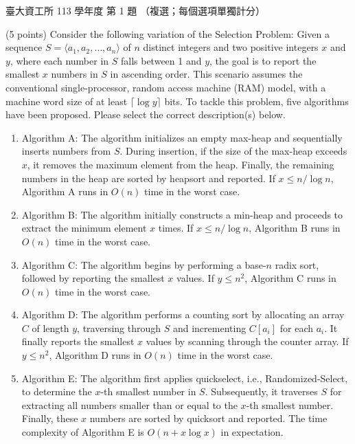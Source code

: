 \begin{pastexam}[label={px:ntu-113-dsa-01}]{臺大資工所 113 學年度 第 1 題}
（複選；每個選項單獨計分）

(5 points) Consider the following variation of the Selection Problem: Given a sequence
$S=\langle a_1,a_2,\ldots,a_n\rangle$ of $n$ distinct integers and two positive integers $x$ and $y$,
where each number in $S$ falls between 1 and $y$, the goal is to report the smallest $x$ numbers in
$S$ in ascending order. This scenario assumes the conventional single-processor, random access
machine (RAM) model, with a machine word size of at least $\lceil\log y\rceil$ bits. To tackle this
problem, five algorithms have been proposed. Please select the correct description(s) below.
\begin{enumerate}[label=\Alph*.]
\item Algorithm A: The algorithm initializes an empty max-heap and sequentially inserts numbers from
$S$. During insertion, if the size of the max-heap exceeds $x$, it removes the maximum element from
the heap. Finally, the remaining numbers in the heap are sorted by heapsort and reported. If
$x\le n/\log n$, Algorithm A runs in $O(n)$ time in the worst case.
\item Algorithm B: The algorithm initially constructs a min-heap and proceeds to extract the minimum
element $x$ times. If $x\le n/\log n$, Algorithm B runs in $O(n)$ time in the worst case.
\item Algorithm C: The algorithm begins by performing a base-$n$ radix sort, followed by reporting
the smallest $x$ values. If $y\le n^2$, Algorithm C runs in $O(n)$ time in the worst case.
\item Algorithm D: The algorithm performs a counting sort by allocating an array $C$ of length $y$,
traversing through $S$ and incrementing $C[a_i]$ for each $a_i$. It finally reports the smallest
$x$ values by scanning through the counter array. If $y\le n^2$, Algorithm D runs in $O(n)$ time in
the worst case.
\item Algorithm E: The algorithm first applies quickselect, i.e., Randomized-Select, to determine
the $x$-th smallest number in $S$. Subsequently, it traverses $S$ for extracting all numbers smaller
than or equal to the $x$-th smallest number. Finally, these $x$ numbers are sorted by quicksort and
reported. The time complexity of Algorithm E is $O(n+x\log x)$ in expectation.
\end{enumerate}
\end{pastexam}

